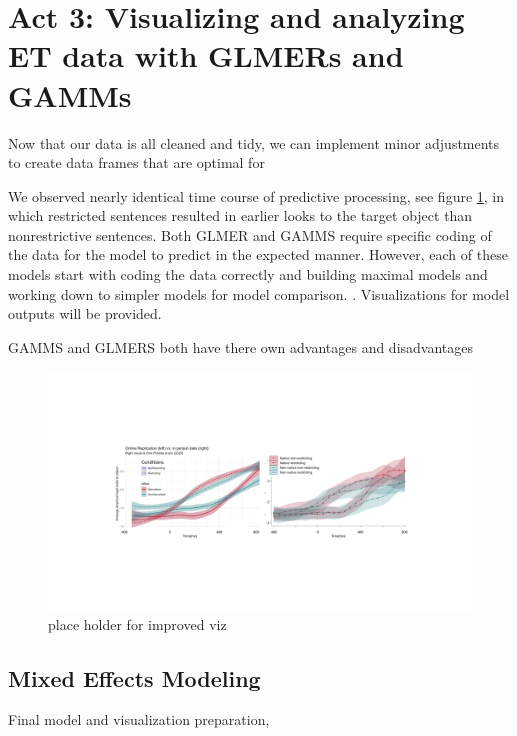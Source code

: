 \section{Act 3: Visualizing and analyzing ET data with GLMERs and GAMMs}
Now that our data is all cleaned and tidy, we can implement minor adjustments to create data frames that are optimal for 







We observed nearly identical time course of predictive processing, see figure \ref{fig:comparitive}, in which restricted sentences resulted in earlier looks to the target object than nonrestrictive sentences. Both GLMER and GAMMS require specific coding of the data for the model to predict in the expected manner.  However, each of these models start with coding the data correctly and building maximal models and working down to simpler models for model comparison. \parencite{max model}. Visualizations for model outputs will be provided.





GAMMS and GLMERS both have there own advantages and disadvantages \parencite{Ito_Knoeferle_2022}
\begin{figure}[h]
    \centering
    \includegraphics[width=\textwidth]{figures/comparitive.jpeg}
    \caption{place holder for improved viz}
    \label{fig:comparitive}
\end{figure}

\subsection{Mixed Effects Modeling}
Final model and visualization preparation, 

